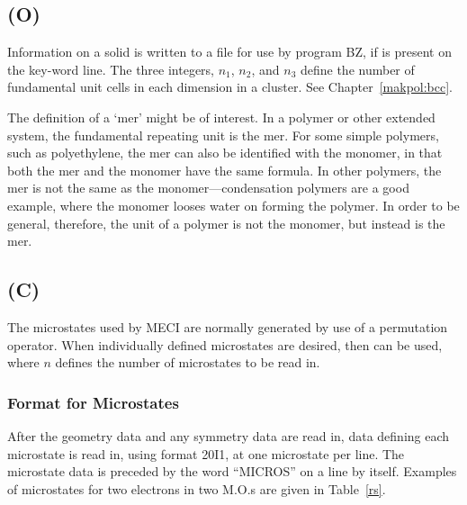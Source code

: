 \subsection*{ (O)}
\label{mopac:mers}
   Information on a solid is written to a file for use by program BZ, if
is present on the key-word line.  The three integers,
$n_1$, $n_2$, and $n_3$ define the number of fundamental unit cells in each
dimension in a cluster.   See Chapter~\ref{makpol:bcc}.

The definition of a `mer' might be of interest.  In a polymer or other extended
system, the fundamental repeating unit is the mer.  For some simple polymers,
such as polyethylene, the mer can also be identified with the monomer, in that
both the mer and the monomer have the same formula.  In other polymers, the
mer is not the same as the monomer---condensation polymers are a good example, where
the monomer looses water on forming the polymer.  In order to be general, therefore,
the unit of a polymer is not the monomer, but instead is the mer.


\subsection*{ (C)}
        The microstates used by MECI are normally  generated  by  use  of  a
   permutation operator.  When individually defined microstates are desired,
   then  can be used, where $n$ defines the number of  microstates  to
   be read in.


\subsubsection*{Format for Microstates}
        After the geometry data and  any symmetry data  are  read  in,  data
   defining  each  microstate  is read in, using format 20I1, at one microstate
   per line.  The microstate data is preceded by the word ``MICROS'' on a line
   by  itself.
    Examples of microstates for two electrons in two M.O.s are
given in Table~\ref{rs}.

